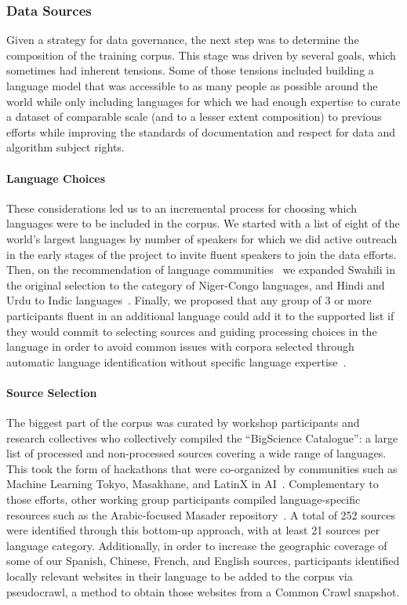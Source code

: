 \subsubsection{Data Sources}
\label{sec:sourcing}

Given a strategy for data governance, the next step was to determine the composition of the training corpus. This stage was driven by several goals, which sometimes had inherent tensions. Some of those tensions included building a language model that was accessible to as many people as possible around the world while only including languages for which we had enough expertise to curate a dataset of comparable scale (and to a lesser extent composition) to previous efforts while improving the standards of documentation and respect for data and algorithm subject rights.

\paragraph{Language Choices} These considerations led us to an incremental process for choosing which languages were to be included in the corpus. We started with a list of eight of the world's largest languages by number of speakers for which we did active outreach in the early stages of the project to invite fluent speakers to join the data efforts. Then, on the recommendation of language communities~\citep{nekoto2020participatory} we expanded Swahili in the original selection to the category of Niger-Congo languages, and Hindi and Urdu to Indic languages~\citep{kunchukuttan2020indic}. Finally, we proposed that any group of 3 or more participants fluent in an additional language could add it to the supported list if they would commit to selecting sources and guiding processing choices in the language in order to avoid common issues with corpora selected through automatic language identification without specific language expertise~\citep{caswell2022quality}.

\paragraph{Source Selection} The biggest part of the corpus was curated by workshop participants and research collectives who collectively compiled the ``BigScience Catalogue'': a large list of processed and non-processed sources covering a wide range of languages. This took the form of hackathons that were co-organized by communities such as Machine Learning Tokyo, Masakhane, and LatinX in AI~\citep{mcmillan-major2022documenting}. Complementary to those efforts, other working group participants compiled language-specific resources such as the Arabic-focused Masader repository~\citep{alyafeai2021masader,alyafeai2022masader}. A total of 252 sources were identified through this bottom-up approach, with at least 21 sources per language category. Additionally, in order to increase the geographic coverage of some of our Spanish, Chinese, French, and English sources, participants identified locally relevant websites in their language to be added to the corpus via pseudocrawl, a method to obtain those websites from a Common Crawl snapshot.

